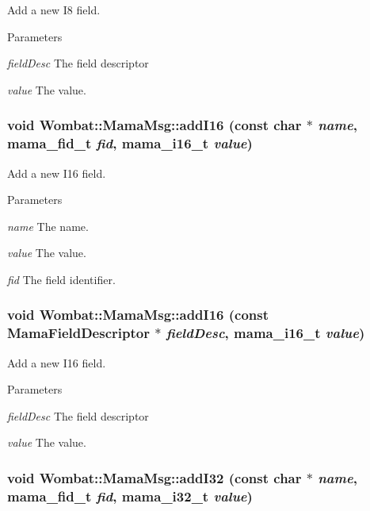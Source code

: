 Add a new I8 field. 
\begin{DoxyParams}{Parameters}
\item[{\em fieldDesc}]The field descriptor \item[{\em value}]The value. \end{DoxyParams}
\hypertarget{classWombat_1_1MamaMsg_a92d4996b4408cab8a6851e993fcc8050}{
\subsubsection[{addI16}]{\setlength{\rightskip}{0pt plus 5cm}void Wombat::MamaMsg::addI16 (const char $\ast$ {\em name}, \/  mama\_\-fid\_\-t {\em fid}, \/  mama\_\-i16\_\-t {\em value})}}
\label{classWombat_1_1MamaMsg_a92d4996b4408cab8a6851e993fcc8050}


Add a new I16 field. 
\begin{DoxyParams}{Parameters}
\item[{\em name}]The name. \item[{\em value}]The value. \item[{\em fid}]The field identifier. \end{DoxyParams}
\hypertarget{classWombat_1_1MamaMsg_ae707d1744fadaecb47f15237f291af7c}{
\subsubsection[{addI16}]{\setlength{\rightskip}{0pt plus 5cm}void Wombat::MamaMsg::addI16 (const {\bf MamaFieldDescriptor} $\ast$ {\em fieldDesc}, \/  mama\_\-i16\_\-t {\em value})}}
\label{classWombat_1_1MamaMsg_ae707d1744fadaecb47f15237f291af7c}


Add a new I16 field. 
\begin{DoxyParams}{Parameters}
\item[{\em fieldDesc}]The field descriptor \item[{\em value}]The value. \end{DoxyParams}
\hypertarget{classWombat_1_1MamaMsg_ab95bac9d585bc609540e5f5c06ae5fcd}{
\subsubsection[{addI32}]{\setlength{\rightskip}{0pt plus 5cm}void Wombat::MamaMsg::addI32 (const char $\ast$ {\em name}, \/  mama\_\-fid\_\-t {\em fid}, \/  mama\_\-i32\_\-t {\em value})}}
\label{classWombat_1_1MamaMsg_ab95bac9d585bc609540e5f5c06ae5fcd}


